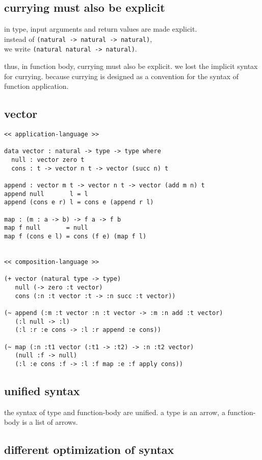 \documentclass{sigplanconf}
\begin{document}
\subsection{currying must also be explicit}

in type, input arguments and return values are made explicit. \\
instead of {\scriptsize\verb|(natural -> natural -> natural)|}, \\
we write {\scriptsize\verb|(natural natural -> natural)|}.

thus, in function body, currying must also be explicit.
we lost the implicit syntax for currying.
because currying is designed as a convention
for the syntax of function application.

\subsection{vector}

{\scriptsize\begin{verbatim}
<< application-language >>

data vector : natural -> type -> type where
  null : vector zero t
  cons : t -> vector n t -> vector (succ n) t

append : vector m t -> vector n t -> vector (add m n) t
append null       l = l
append (cons e r) l = cons e (append r l)

map : (m : a -> b) -> f a -> f b
map f null       = null
map f (cons e l) = cons (f e) (map f l)


<< composition-language >>

(+ vector (natural type -> type)
   null (-> zero :t vector)
   cons (:n :t vector :t -> :n succ :t vector))

(~ append (:m :t vector :n :t vector -> :m :n add :t vector)
   (:l null -> :l)
   (:l :r :e cons -> :l :r append :e cons))

(~ map (:n :t1 vector (:t1 -> :t2) -> :n :t2 vector)
   (null :f -> null)
   (:l :e cons :f -> :l :f map :e :f apply cons))
\end{verbatim}}

\subsection{unified syntax}

the syntax of type and function-body are unified.
a type is an arrow, a function-body is a list of arrows.

\subsection{different optimization of syntax}
\end{document}
